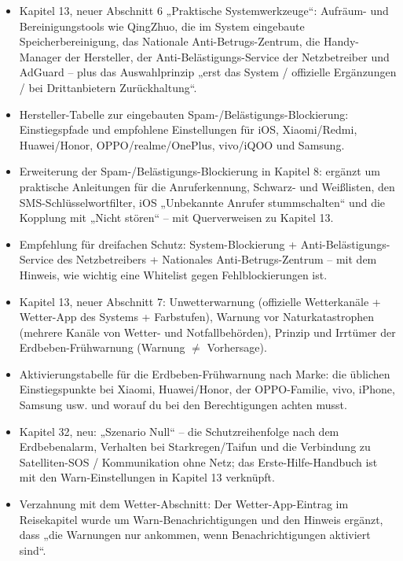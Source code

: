 
\begin{itemize}
  \item Kapitel 13, neuer Abschnitt 6 „Praktische Systemwerkzeuge“: Aufräum- und Bereinigungstools wie QingZhuo, die im System eingebaute Speicherbereinigung, das Nationale Anti-Betrugs-Zentrum, die Handy-Manager der Hersteller, der Anti-Belästigungs-Service der Netzbetreiber und AdGuard – plus das Auswahlprinzip „erst das System / offizielle Ergänzungen / bei Drittanbietern Zurückhaltung“.
  \item Hersteller-Tabelle zur eingebauten Spam-/Belästigungs-Blockierung: Einstiegspfade und empfohlene Einstellungen für iOS, Xiaomi/Redmi, Huawei/Honor, OPPO/realme/OnePlus, vivo/iQOO und Samsung.
  \item Erweiterung der Spam-/Belästigungs-Blockierung in Kapitel 8: ergänzt um praktische Anleitungen für die Anruferkennung, Schwarz- und Weißlisten, den SMS-Schlüsselwortfilter, iOS „Unbekannte Anrufer stummschalten“ und die Kopplung mit „Nicht stören“ – mit Querverweisen zu Kapitel 13.
  \item Empfehlung für dreifachen Schutz: System-Blockierung + Anti-Belästigungs-Service des Netzbetreibers + Nationales Anti-Betrugs-Zentrum – mit dem Hinweis, wie wichtig eine Whitelist gegen Fehlblockierungen ist.
\end{itemize}


\begin{itemize}
  \item Kapitel 13, neuer Abschnitt 7: Unwetterwarnung (offizielle Wetterkanäle + Wetter-App des Systems + Farbstufen), Warnung vor Naturkatastrophen (mehrere Kanäle von Wetter- und Notfallbehörden), Prinzip und Irrtümer der Erdbeben-Frühwarnung (Warnung $\neq$ Vorhersage).
  \item Aktivierungstabelle für die Erdbeben-Frühwarnung nach Marke: die üblichen Einstiegspunkte bei Xiaomi, Huawei/Honor, der OPPO-Familie, vivo, iPhone, Samsung usw. und worauf du bei den Berechtigungen achten musst.
  \item Kapitel 32, neu: „Szenario Null“ – die Schutzreihenfolge nach dem Erdbebenalarm, Verhalten bei Starkregen/Taifun und die Verbindung zu Satelliten-SOS / Kommunikation ohne Netz; das Erste-Hilfe-Handbuch ist mit den Warn-Einstellungen in Kapitel 13 verknüpft.
  \item Verzahnung mit dem Wetter-Abschnitt: Der Wetter-App-Eintrag im Reisekapitel wurde um Warn-Benachrichtigungen und den Hinweis ergänzt, dass „die Warnungen nur ankommen, wenn Benachrichtigungen aktiviert sind“.
\end{itemize}

